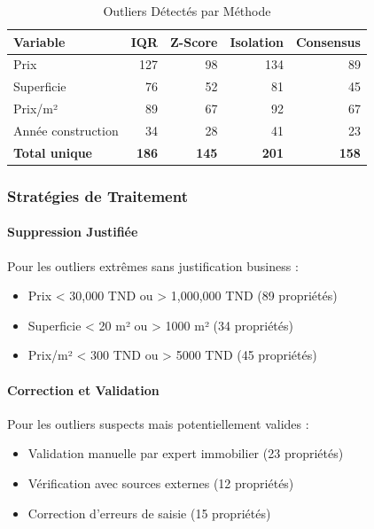 \begin{table}[H]
\centering
\caption{Outliers Détectés par Méthode}
\begin{tabular}{|l|r|r|r|r|}
\hline
\textbf{Variable} & \textbf{IQR} & \textbf{Z-Score} & \textbf{Isolation} & \textbf{Consensus} \\
\hline
Prix & 127 & 98 & 134 & 89 \\
\hline
Superficie & 76 & 52 & 81 & 45 \\
\hline
Prix/m² & 89 & 67 & 92 & 67 \\
\hline
Année construction & 34 & 28 & 41 & 23 \\
\hline
\textbf{Total unique} & \textbf{186} & \textbf{145} & \textbf{201} & \textbf{158} \\
\hline
\end{tabular}
\label{tab:outliers_detectes}
\end{table}

\subsubsection{Stratégies de Traitement}

\paragraph{Suppression Justifiée}
Pour les outliers extrêmes sans justification business :

\begin{itemize}
    \item Prix < 30,000 TND ou > 1,000,000 TND (89 propriétés)
    \item Superficie < 20 m² ou > 1000 m² (34 propriétés)
    \item Prix/m² < 300 TND ou > 5000 TND (45 propriétés)
\end{itemize}

\paragraph{Correction et Validation}
Pour les outliers suspects mais potentiellement valides :

\begin{itemize}
    \item Validation manuelle par expert immobilier (23 propriétés)
    \item Vérification avec sources externes (12 propriétés)
    \item Correction d'erreurs de saisie (15 propriétés)
\end{itemize}

